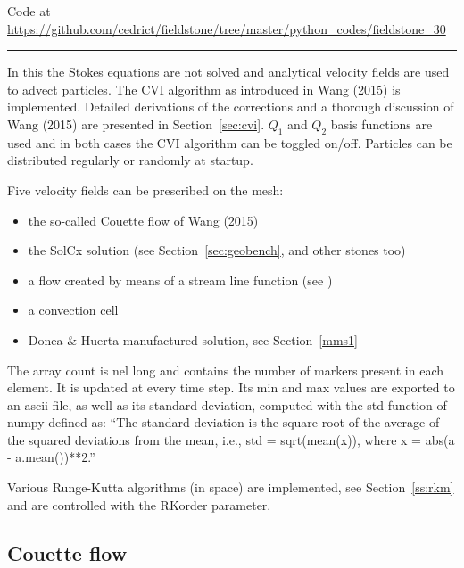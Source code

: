 


\begin{center}
Code at \url{https://github.com/cedrict/fieldstone/tree/master/python_codes/fieldstone_30}
\end{center}

\par\noindent\rule{\textwidth}{0.4pt}

In this \stone the Stokes equations are not solved and analytical 
velocity fields are used to advect particles. The CVI algorithm 
as introduced in Wang \etal (2015) \cite{waav15} is implemented.
Detailed derivations of the corrections and a thorough discussion 
of Wang \etal (2015) are presented in Section~\ref{sec:cvi}.
$Q_1$ and $Q_2$ basis functions are used and in both cases the CVI algorithm can be toggled on/off. 
Particles can be distributed regularly or randomly at startup.

Five velocity fields can be prescribed on the mesh:
\begin{itemize}
\item the so-called Couette flow of Wang \etal (2015) \cite{waav15} 
\item the SolCx solution (see Section~\ref{sec:geobench}, and  other stones too)
\item a flow created by means of a stream line function (see )
\item a convection cell 
\item Donea \& Huerta manufactured solution, see Section~\ref{mms1}
\end{itemize}

The array {\python count} is {\python nel} long and contains the number of markers present in each element.
It is updated at every time step. Its min and max values are exported to an ascii file, as well 
as its standard deviation, computed with the {\python std} function of numpy defined as:
``The standard deviation is the square root of the average of the squared deviations from the mean, 
i.e., std = sqrt(mean(x)), where x = abs(a - a.mean())**2.''

Various Runge-Kutta algorithms (in space) are implemented, see Section~\ref{ss:rkm} and are 
controlled with the {\python RKorder} parameter.

\subsection*{Couette flow}

